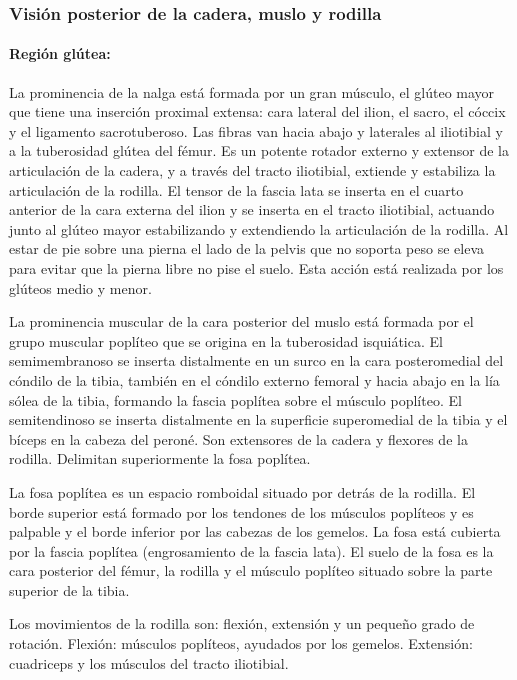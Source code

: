 \documentclass[a4paper,12pt]{article} %
\begin{document}
\begin{appendices}
\subsubsection{Visión posterior de la cadera, muslo y rodilla}
\paragraph{Región glútea:} La prominencia de la nalga está formada por un gran músculo, el glúteo mayor que tiene una inserción proximal extensa: cara lateral del ilion, el sacro, el cóccix y el ligamento sacrotuberoso. Las fibras  van hacia abajo y laterales al iliotibial y a la tuberosidad glútea del fémur. Es un potente rotador externo y extensor de la articulación de la cadera, y a través del tracto iliotibial, extiende y estabiliza la articulación de la rodilla. El tensor de la fascia lata se inserta en el cuarto anterior de la cara externa del ilion y se inserta en el tracto iliotibial, actuando junto al glúteo mayor estabilizando y extendiendo la articulación de la rodilla.
Al estar de pie sobre una pierna el lado de la pelvis que no soporta peso se eleva para evitar que la pierna libre no pise el suelo. Esta acción está realizada por los glúteos medio y menor.

\vspace{12pt}

La prominencia muscular de la cara posterior del muslo está formada por el grupo muscular poplíteo que se origina en la tuberosidad isquiática. El semimembranoso se inserta distalmente en un surco en la cara posteromedial del cóndilo de la tibia, también en el cóndilo externo femoral y hacia abajo en la lía sólea de la tibia, formando la fascia poplítea sobre el músculo poplíteo. El semitendinoso se inserta distalmente en la superficie superomedial de la tibia y el bíceps en la cabeza del peroné. Son extensores de la cadera y flexores de la rodilla. Delimitan superiormente la fosa poplítea.

La fosa poplítea es un espacio romboidal situado por detrás de la rodilla. El borde superior está formado por los tendones de los músculos poplíteos y es palpable y el borde inferior por las cabezas de los gemelos. La fosa está cubierta por la fascia poplítea (engrosamiento de la fascia lata). El suelo de la fosa es la cara posterior del fémur, la rodilla y el músculo poplíteo situado sobre la parte superior de la tibia.

Los movimientos de la rodilla son: flexión, extensión y un pequeño grado de rotación. Flexión: músculos poplíteos, ayudados por los gemelos. Extensión: cuadriceps y los músculos del tracto iliotibial.


\end{appendices}
\end{document}
